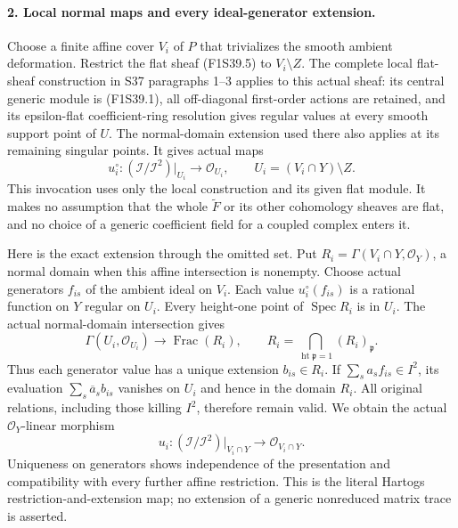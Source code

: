 \paragraph{2. Local normal maps and every ideal-generator extension.}
Choose a finite affine cover $V_i$ of $P$ that
trivializes the smooth ambient deformation.
Restrict the flat sheaf (F1S39.5) to
$V_i\setminus Z$. The complete local
flat-sheaf construction in S37 paragraphs 1--3
applies to this actual sheaf: its central
generic module is (F1S39.1), all off-diagonal
first-order actions are retained, and its
epsilon-flat coefficient-ring resolution gives
regular values at every smooth support point
of $U$. The normal-domain extension used there
also applies at its remaining singular points.
It gives actual maps
\[
 u_i^\circ:(\mathcal I/\mathcal I^2)|_{U_i}
                 \longrightarrow\mathcal O_{U_i},
 \qquad U_i=(V_i\cap Y)\setminus Z.
 \tag{F1S39.7}
\]
This invocation uses only the local construction
and its given flat module. It makes no assumption
that the whole $\widetilde F$ or its other
cohomology sheaves are flat, and no choice of a
generic coefficient field for a coupled complex
enters it.

Here is the exact extension through the omitted
set. Put $R_i=\Gamma(V_i\cap Y,\mathcal O_Y)$,
a normal domain when this affine intersection
is nonempty. Choose actual generators $f_{is}$
of the ambient ideal on $V_i$. Each value
$u_i^\circ(f_{is})$ is a rational function on
$Y$ regular on $U_i$. Every height-one point
of $\operatorname{Spec}R_i$ is in $U_i$.
The actual normal-domain intersection gives
\[
 \Gamma(U_i,\mathcal O_{U_i})
       \longrightarrow\operatorname{Frac}(R_i),
 \qquad
 R_i=\bigcap_{\operatorname{ht}\mathfrak p=1}
                 (R_i)_{\mathfrak p}.
 \tag{F1S39.8}
\]
Thus each generator value has a unique extension
$b_{is}\in R_i$. If
$\sum_s a_s f_{is}\in I^2$, its evaluation
$\sum_s\overline a_s b_{is}$ vanishes on
$U_i$ and hence in the domain $R_i$.
All original relations, including those killing
$I^2$, therefore remain valid. We obtain the
actual $\mathcal O_Y$-linear morphism
\[
 u_i:(\mathcal I/\mathcal I^2)|_{V_i\cap Y}
                   \longrightarrow\mathcal O_{V_i\cap Y}.
 \tag{F1S39.9}
\]
Uniqueness on generators shows independence of
the presentation and compatibility with every
further affine restriction. This is the
literal Hartogs restriction-and-extension map;
no extension of a generic nonreduced matrix
trace is asserted.

